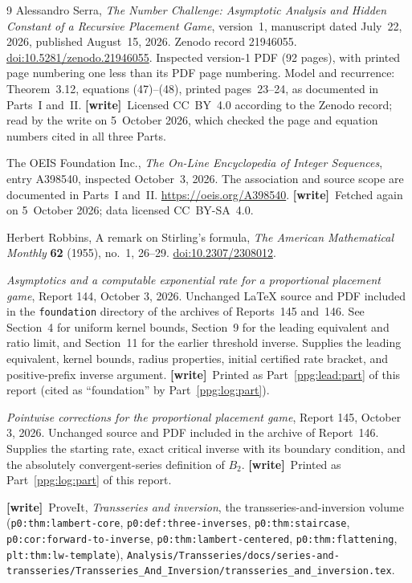 \documentclass[11pt,letterpaper]{article}
\theoremstyle{remark}\newtheorem{remark}[theorem]{Remark}
\numberwithin{equation}{section}
\newcommand{\file}[1]{\nolinkurl{#1}}
\newcommand{\wtag}{\textup{\textbf{[write]}}}
\begin{document}
\begin{thebibliography}{9}
Alessandro Serra, \emph{The Number Challenge: Asymptotic Analysis and Hidden Constant of a Recursive Placement Game}, version~1, manuscript dated July~22, 2026, published August~15, 2026. Zenodo record 21946055.
\href{https://doi.org/10.5281/zenodo.21946055}{doi:10.5281/zenodo.21946055}. Inspected version-1 PDF (92 pages), with printed page numbering one less than its PDF page numbering. Model and recurrence: Theorem~3.12, equations (47)--(48), printed pages~23--24, as documented in Parts~I and~II. \wtag\ Licensed CC~BY~4.0 according to the Zenodo record; read by the write on 5~October 2026, which checked the page and equation numbers cited in all three Parts.

The OEIS Foundation Inc., \emph{The On-Line Encyclopedia of Integer Sequences}, entry A398540, inspected October~3, 2026. The association and source scope are documented in Parts~I and~II.
\url{https://oeis.org/A398540}. \wtag\ Fetched again on 5~October 2026; data licensed CC~BY-SA~4.0.

Herbert Robbins, A remark on Stirling's formula, \emph{The American Mathematical Monthly} \textbf{62} (1955), no.~1, 26--29.
\href{https://doi.org/10.2307/2308012}{doi:10.2307/2308012}.

\emph{Asymptotics and a computable exponential rate for a proportional placement game}, Report 144, October 3, 2026. Unchanged LaTeX source and PDF included in the \texttt{foundation} directory of the archives of Reports~145 and~146. See Section~4 for uniform kernel bounds, Section~9 for the leading equivalent and ratio limit, and Section~11 for the earlier threshold inverse. Supplies the leading equivalent, kernel bounds, radius properties, initial certified rate bracket, and positive-prefix inverse argument. \wtag\ Printed as Part~\ref{ppg:lead:part} of this report (cited as ``foundation'' by Part~\ref{ppg:log:part}).

\emph{Pointwise corrections for the proportional placement game}, Report 145, October 3, 2026. Unchanged source and PDF included in the archive of Report~146. Supplies the starting rate, exact critical inverse with its boundary condition, and the absolutely convergent-series definition of $B_2$. \wtag\ Printed as Part~\ref{ppg:log:part} of this report.

\raggedright\wtag\ ProveIt, \emph{Transseries and inversion}, the transseries-and-inversion volume (\texttt{p0:thm:lambert-core}, \texttt{p0:def:three-inverses}, \texttt{p0:thm:staircase}, \texttt{p0:cor:forward-to-inverse}, \texttt{p0:thm:lambert-centered}, \texttt{p0:thm:flattening}, \texttt{plt:thm:lw-template}), \file{Analysis/Transseries/docs/series-and-transseries/Transseries_And_Inversion/transseries_and_inversion.tex}.
\end{thebibliography}
\end{document}
